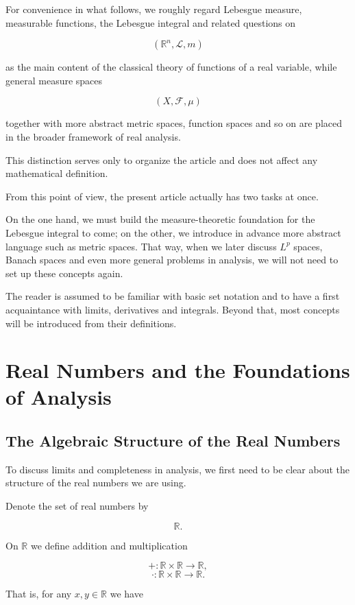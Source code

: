 \documentclass[11pt]{article}
\begin{document}
For convenience in what follows, we roughly regard Lebesgue measure, measurable functions, the Lebesgue integral and related questions on

\[
(\mathbb{R}^{n},\mathcal{L},m)
\]

as the main content of the classical theory of functions of a real variable, while general measure spaces

\[
(X,\mathcal{F},\mu)
\]

together with more abstract metric spaces, function spaces and so on are placed in the broader framework of real analysis.

This distinction serves only to organize the article and does not affect any mathematical definition.

From this point of view, the present article actually has two tasks at once.

On the one hand, we must build the measure-theoretic foundation for the Lebesgue integral to come; on the other, we introduce in advance more abstract language such as metric spaces. That way, when we later discuss $L^{p}$ spaces, Banach spaces and even more general problems in analysis, we will not need to set up these concepts again.

The reader is assumed to be familiar with basic set notation and to have a first acquaintance with limits, derivatives and integrals. Beyond that, most concepts will be introduced from their definitions.

\section{Real Numbers and the Foundations of Analysis}

\subsection{The Algebraic Structure of the Real Numbers}

To discuss limits and completeness in analysis, we first need to be clear about the structure of the real numbers we are using.

Denote the set of real numbers by

\[
\mathbb{R}.
\]

On $\mathbb{R}$ we define addition and multiplication

\[
+:\mathbb{R}\times\mathbb{R}\rightarrow\mathbb{R},
\]
\[
\cdot:\mathbb{R}\times\mathbb{R}\rightarrow\mathbb{R}.
\]

That is, for any $x,y\in\mathbb{R}$ we have
\end{document}
